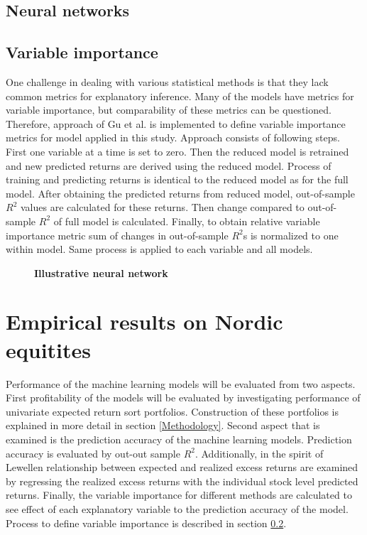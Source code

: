 \documentclass{article}
\begin{document}
\subsection{Neural networks}

\subsection{Variable importance} \label{VariableImportance}

One challenge in dealing with various statistical methods is that they lack common metrics for explanatory inference. Many of the models have metrics for variable importance, but comparability of these metrics can be questioned. Therefore, approach of Gu et al. \citeyear{guetal} is implemented to define variable importance metrics for model applied in this study. Approach consists of following steps. First one variable at a time is set to zero. Then the reduced model is retrained and new predicted returns are derived using the reduced model. Process of training and predicting returns is identical to the reduced model as for the full model. After obtaining the predicted returns from reduced model, out-of-sample $R^2$ values are calculated for these returns. Then change compared to out-of-sample $R^2$ of full model is calculated. Finally, to obtain relative variable importance metric sum of changes in out-of-sample $R^2$s is normalized to one within model. Same process is applied to each variable and all models.

\begin{figure}
\centering
\caption[Illustrative neural network]{\textbf{Illustrative neural network}\\  }

\label{plot:NN}
\end{figure}

\section{Empirical results on Nordic equitites}

Performance of the machine learning models will be evaluated from two aspects. First profitability of the models will be evaluated by investigating performance of univariate expected return sort portfolios. Construction of these portfolios is explained in more detail in section \ref{Methodology}. Second aspect that is examined is the prediction accuracy of the machine learning models. Prediction accuracy is evaluated by out-out sample $R^2$. Additionally, in the spirit of Lewellen \citeyear{lewellen2015} relationship between expected and realized excess returns are examined by regressing the realized excess returns with the individual stock level predicted returns. Finally, the variable importance for different methods are calculated to see effect of each explanatory variable to the prediction accuracy of the model. Process to define variable importance is described in section \ref{VariableImportance}.
\end{document}
